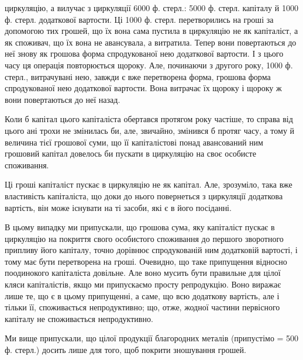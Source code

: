 \parcont{}  %
циркуляцію, а вилучає з циркуляції 6000 ф. стерл.: 5000 ф. стерл. капіталу й
1000 ф. стерл. додаткової вартости. Ці 1000 ф. стерл. перетворились на
гроші за допомогою тих грошей, що їх вона сама пустила в циркуляцію
не як капіталіст, а як споживач, що їх вона не авансувала, а витратила.
Тепер вони повертаються до неї знову як грошова форма спродукованої
нею додаткової вартости. І з цього часу ця операція повторюється
щороку. Але, починаючи з другого року, 1000 ф. стерл., витрачувані нею,
завжди є вже перетворена форма, грошова форма спродукованої нею
додаткової вартости. Вона витрачає їх щороку і щороку ж вони повертаються
до неї назад.

Коли б капітал цього капіталіста обертався протягом року частіше,
то справа від цього ані трохи не змінилась би, але, звичайно, змінився
б протяг часу, а тому й величина тієї грошової суми, що її капіталістові
понад авансований ним грошовий капітал довелось би пускати в
циркуляцію на своє особисте споживання.

Ці гроші капіталіст пускає в циркуляцію не як капітал. Але, зрозуміло,
така вже властивість капіталіста, що доки до нього повернеться з
циркуляції додаткова вартість, він може існувати на ті засоби, які є в
його посіданні.

В цьому випадку ми припускали, що грошова сума, яку капіталіст
пускає в циркуляцію на покриття свого особистого споживання до першого
зворотного припливу його капіталу, точно дорівнює спродукованій ним
додатковій вартості, і тому має бути перетворена на гроші. Очевидно,
що таке припущення відносно поодинокого капіталіста довільне. Але
воно мусить бути правильне для цілої кляси капіталістів, якщо ми
припускаємо просту репродукцію. Воно виражає лише те, що є в цьому
припущенні, а саме, що всю додаткову вартість, але і тільки її, споживається
непродуктивно; що, отже, жодної частини первісного капіталу
не споживається непродуктивно.

Ми вище припускали, що цілої продукції благородних металів
(припустімо = 500 ф. стерл.) досить лише для того, щоб покрити зношування
грошей.

